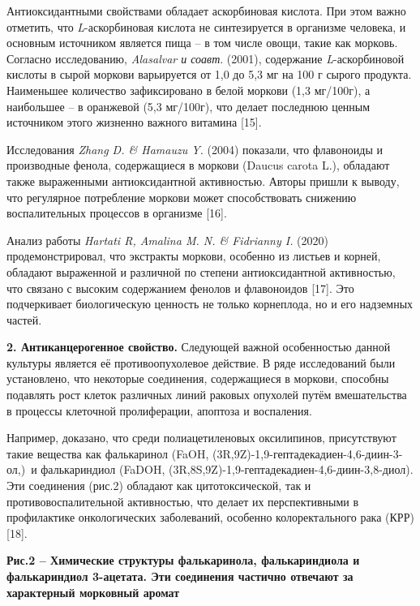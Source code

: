 Антиоксидантными свойствами обладает аскорбиновая кислота. При этом
важно отметить, что \emph{L}-аскорбиновая кислота не синтезируется в
организме человека, и основным источником является пища -- в том числе
овощи, такие как морковь. Согласно исследованию, \emph{Alasalvar и
соавт}. (2001), содержание \emph{L}-аскорбиновой кислоты в сырой моркови
варьируется от 1,0 до 5,3 мг на 100 г сырого продукта. Наименьшее
количество зафиксировано в белой моркови (1,3 мг/100г), а наибольшее --
в оранжевой (5,3 мг/100г), что делает последнюю ценным источником этого
жизненно важного витамина {[}15{]}.

Исследования \emph{Zhang D. \& Hamauzu Y.} (2004) показали, что
флавоноиды и производные фенола, содержащиеся в моркови (Daucus carota
L.), обладают также выраженными антиоксидантной активностью. Авторы
пришли к выводу, что регулярное потребление моркови может способствовать
снижению воспалительных процессов в организме {[}16{]}.

Анализ работы \emph{Hartati R, Amalina M. N. \& Fidrianny I.} (2020)
продемонстрировал, что экстракты моркови, особенно из листьев и корней,
обладают выраженной и различной по степени антиоксидантной активностью,
что связано с высоким содержанием фенолов и флавоноидов {[}17{]}. Это
подчеркивает биологическую ценность не только корнеплода, но и его
надземных частей.

{\bfseries 2. Антиканцерогенное свойство.} Следующей важной особенностью
данной культуры является её противоопухолевое действие. В ряде
исследований были установлено, что некоторые соединения, содержащиеся в
моркови, способны подавлять рост клеток различных линий раковых опухолей
путём вмешательства в процессы клеточной пролиферации, апоптоза и
воспаления.

Например, доказано, что среди полиацетиленовых оксилипинов, присутствуют
такие вещества как фалькаринол (FaOH,
(3R,9Z)-1,9-гептадекадиен-4,6-диин-3-ол,)~и фалькариндиол (FaDOH,
(3R,8S,9Z)-1,9-гептадекадиен-4,6-диин-3,8-диол). Эти соединения (рис.2)
обладают как цитотоксической, так и противовоспалительной активностью,
что делает их перспективными в профилактике онкологических заболеваний,
особенно колоректального рака (КРР) {[}18{]}.


{\bfseries Рис.2 -- Химические структуры фалькаринола, фалькариндиола и
фалькариндиол 3-ацетата. Эти соединения частично отвечают за характерный
морковный аромат}

